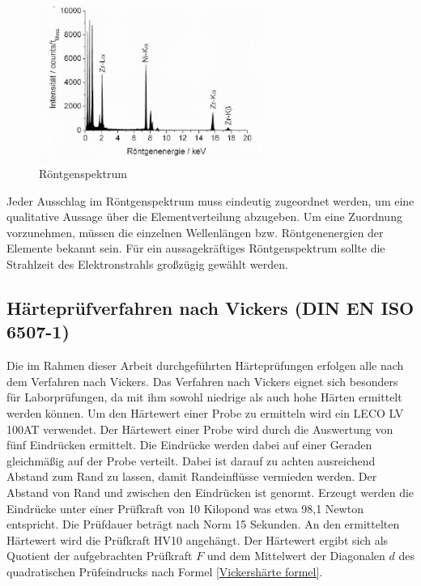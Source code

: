 \documentclass[a4paper, 11pt]{tubsreprt}
\begin{document}
\begin{figure}
\centering
\includegraphics[width=0.66\textwidth]{Bilder/Roentgenspektrum.png}
\caption[Röntgenspektrum]{Röntgenspektrum \cite{Gemming2013}}
\label{Röntgenspektrum1}
\end{figure}

Jeder Ausschlag im Röntgenspektrum muss eindeutig zugeordnet werden, um eine qualitative Aussage über die Elementverteilung abzugeben. Um eine Zuordnung vorzunehmen, müssen die einzelnen Wellenlängen bzw. Röntgenenergien der Elemente bekannt sein. Für ein aussagekräftiges Röntgenspektrum sollte die Strahlzeit des Elektronstrahls großzügig gewählt werden.   




\subsection{Härteprüfverfahren nach Vickers (DIN EN ISO 6507-1)} \label{Kapitel Härte}
Die im Rahmen dieser Arbeit durchgeführten Härteprüfungen erfolgen alle nach dem Verfahren nach Vickers. Das Verfahren nach Vickers eignet sich besonders für Laborprüfungen, da mit ihm sowohl niedrige als auch hohe Härten ermittelt werden können. Um den Härtewert einer Probe zu ermitteln wird ein LECO LV 100AT verwendet. Der Härtewert einer Probe wird durch die Auswertung von fünf Eindrücken ermittelt. Die Eindrücke werden dabei auf einer Geraden gleichmäßig auf der Probe verteilt. Dabei ist darauf zu achten ausreichend Abstand zum Rand zu lassen, damit Randeinflüsse vermieden werden. Der Abstand von Rand und zwischen den Eindrücken ist genormt.
Erzeugt werden die Eindrücke unter einer Prüfkraft von 10 Kilopond was etwa 98,1 Newton entspricht. Die Prüfdauer beträgt nach Norm 15 Sekunden. An den ermittelten Härtewert wird die Prüfkraft HV10 angehängt. Der Härtewert ergibt sich als Quotient der aufgebrachten Prüfkraft $F$ und dem Mittelwert der Diagonalen $d$ des quadratischen Prüfeindrucks nach Formel \ref{Vickershärte formel}.
\end{document}
